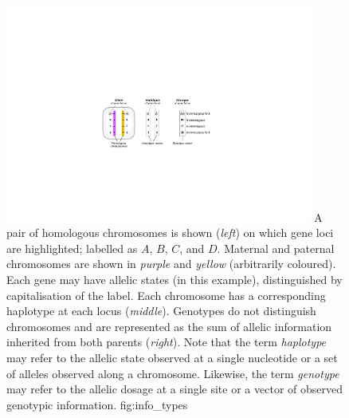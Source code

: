 

\begin{figure}[!htb]
\centering
\includegraphics[width=0.9\textwidth]{./img/ch1/info_types}
{A pair of homologous chromosomes is shown (\emph{left}) on which  gene loci are highlighted; labelled as $A$, $B$, $C$, and $D$.
Maternal and paternal chromosomes are shown in \emph{purple} and \emph{yellow} (arbitrarily coloured).
Each gene may have  allelic states (in this example), distinguished by capitalisation of the label.
Each chromosome has a corresponding haplotype at each locus (\emph{middle}).
Genotypes do not distinguish chromosomes and are represented as the sum of allelic information inherited from both parents (\emph{right}).
Note that the term \emph{haplotype} may refer to the allelic state observed at a single nucleotide or a set of alleles observed along a chromosome.
Likewise, the term \emph{genotype} may refer to the allelic dosage at a single site or a vector of observed genotypic information.}
{fig:info_types}
\end{figure}
